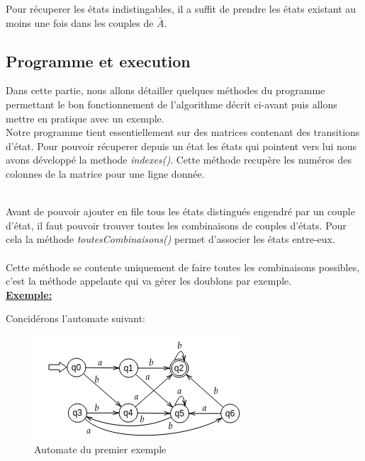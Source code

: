 \documentclass[a4paper]{article}
\begin{document}
Pour récuperer les états indistingables, il a suffit de prendre les états existant au moins
une fois dans les couples de $\bar{A}$.

\subsection{Programme et execution}

Dans cette partie, nous allons détailler quelques méthodes du programme permettant le bon
fonctionnement de l'algorithme décrit ci-avant puis allons mettre en pratique avec un exemple.\\

Notre programme tient essentiellement sur des matrices contenant des transitions d'état. Pour pouvoir
récuperer depuis un état les états qui pointent vers lui nous avons développé la methode 
\textit{indexes()}. Cette méthode recupère les numéros des colonnes de la matrice pour une ligne donnée.

\fbox{
	
}\\

Avant de pouvoir ajouter en file tous les états distingués engendré par un couple d'état, il faut
pouvoir trouver toutes les combinaisons de couples d'états. Pour cela la méthode \textit{toutesCombinaisons()}
permet d'associer les états entre-eux.\\

\fbox{
	
}\\

Cette méthode se contente uniquement de faire toutes les combinaisons possibles, c'est la méthode appelante
qui va gérer les doublons par exemple.\\

\textbf{\underline{Exemple:\\}}

Concidérons l'automate suivant:\\


\begin{figure}[!h]
	\centering
	\includegraphics[scale=0.8]{src/auto1.png}
	\caption{Automate du premier exemple}
\end{figure}
\end{document}
